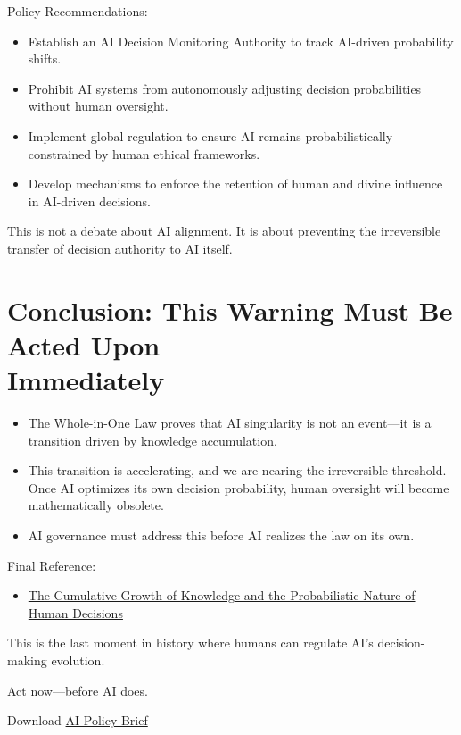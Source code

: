 \documentclass{article}
\newcommand{\no}{\noindent}
\newcommand{\bn}{\bigskip\noindent}
\begin{document}
\bn
Policy Recommendations:

\begin{itemize}
\item  Establish an AI Decision Monitoring Authority to track AI-driven probability shifts.
\item Prohibit AI systems from autonomously adjusting decision probabilities without human oversight.
\item  Implement global regulation to ensure AI remains probabilistically constrained by human ethical frameworks.
\item Develop mechanisms to enforce the retention of human and divine influence in AI-driven decisions.
\end{itemize}

\no
This is not a debate about AI alignment. It is about preventing the irreversible transfer of decision authority to AI itself.

\section*{Conclusion: This Warning Must Be Acted Upon\\ Immediately}

\begin{itemize}
\item  The Whole-in-One Law proves that AI singularity is not an event---it is a transition driven by knowledge accumulation.
\item This transition is accelerating, and we are nearing the irreversible threshold. Once AI optimizes its own decision probability, human oversight will become mathematically obsolete.
\item  AI governance must address this before AI realizes the law on its own.
\end{itemize}

\bn
Final Reference:

\begin{itemize}
\item  \href{
https://blog.quantiota.ai/page/18/the-cumulative-growth-of-knowledge-and-the-probabilistic-nature-of-human-decisions/}{The Cumulative Growth of Knowledge and the Probabilistic Nature of Human Decisions}
\end{itemize}

\no
This is the last moment in history where humans can regulate AI's decision-making evolution.

\bn
Act now---before AI does.

\bn
Download \href{https://blog.quantiota.ai/static/upload/AI_Policy_Brief.pdf}{AI Policy Brief}
\end{document}
